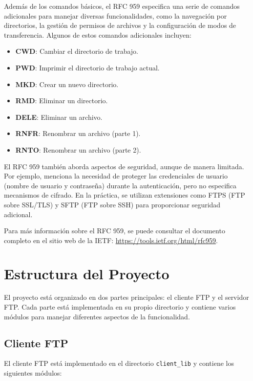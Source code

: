 \documentclass[a4paper, 12pt]{article}
\begin{document}
Además de los comandos básicos, el RFC 959 especifica una serie de comandos adicionales para manejar diversas funcionalidades, como la navegación por directorios, la gestión de permisos de archivos y la configuración de modos de transferencia. Algunos de estos comandos adicionales incluyen:

\begin{itemize}
    \item \textbf{CWD}: Cambiar el directorio de trabajo.
    \item \textbf{PWD}: Imprimir el directorio de trabajo actual.
    \item \textbf{MKD}: Crear un nuevo directorio.
    \item \textbf{RMD}: Eliminar un directorio.
    \item \textbf{DELE}: Eliminar un archivo.
    \item \textbf{RNFR}: Renombrar un archivo (parte 1).
    \item \textbf{RNTO}: Renombrar un archivo (parte 2).
\end{itemize}

El RFC 959 también aborda aspectos de seguridad, aunque de manera limitada. Por ejemplo, menciona la necesidad de proteger las credenciales de usuario (nombre de usuario y contraseña) durante la autenticación, pero no especifica mecanismos de cifrado. En la práctica, se utilizan extensiones como FTPS (FTP sobre SSL/TLS) y SFTP (FTP sobre SSH) para proporcionar seguridad adicional.

Para más información sobre el RFC 959, se puede consultar el documento completo en el sitio web de la IETF: \url{https://tools.ietf.org/html/rfc959}.


\section{Estructura del Proyecto}
El proyecto está organizado en dos partes principales: el cliente FTP y el servidor FTP. Cada parte está implementada en su propio directorio y contiene varios módulos para manejar diferentes aspectos de la funcionalidad.

\subsection{Cliente FTP}
El cliente FTP está implementado en el directorio \texttt{client\_lib} y contiene los siguientes módulos:
\end{document}
